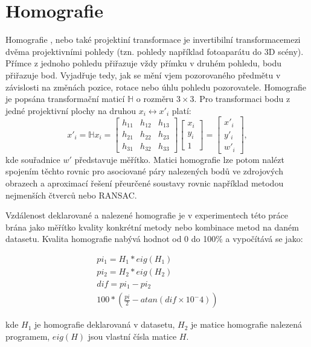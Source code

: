 \section{Homografie}
\label{sec:homo}

Homografie \cite{berenda2010homografie}, nebo také projektiní transformace je invertibilní transformacemezi dvěma projektivními pohledy (tzn. pohledy například fotoaparátu do 3D scény). Přímce z jednoho pohledu přiřazuje vždy přímku v druhém pohledu, bodu přiřazuje bod. Vyjadřuje tedy, jak se mění vjem pozorovaného předmětu v závislosti na změnách pozice, rotace nebo úhlu pohledu pozorovatele. Homografie je popsána transformační maticí $\mathbb{H}$ o rozměru $3\times 3$. Pro transformaci bodu z jedné projektivní plochy na druhou $x_i \leftrightarrow x'_i$ platí:
\begin{equation}
x'_i = \mathbb{H}x_i = 
\begin{bmatrix}
h_{11} & h_{12} & h_{13} \\
h_{21} & h_{22} & h_{23} \\
h_{31} & h_{32} & h_{33}
\end{bmatrix}
\begin{bmatrix}
x_i \\ y_i \\ 1
\end{bmatrix}
= 
\begin{bmatrix}
x'_i \\ y'_i \\ w'_i
\end{bmatrix},
\end{equation} 
kde souřadnice $w'$ představuje měřítko. Matici homografie lze potom nalézt spojením těchto rovnic pro asociované páry nalezených bodů ve zdrojových obrazech a aproximací řešení přeurčené soustavy rovnic například metodou nejmenších čtverců nebo RANSAC. 

Vzdálenost deklarované a nalezené homografie je v experimentech této práce brána jako měřítko kvality konkrétní metody nebo kombinace metod na daném datasetu. Kvalita homografie nabývá hodnot od 0 do 100\% a vypočítává se jako:

\begin{align}
	pi_1 = H_1 * eig(H_1) \\
	pi_2 = H_2 * eig(H_2) \\
	dif = pi_1 - pi_2 \\
	100*(\frac{pi}{2} - atan(dif \times{} 10^-4))
\end{align}

kde $H_1$ je homografie deklarovaná v datasetu, $H_2$ je matice homografie nalezená
programem, $eig(H)$ jsou vlastní čísla matice $H$. 

